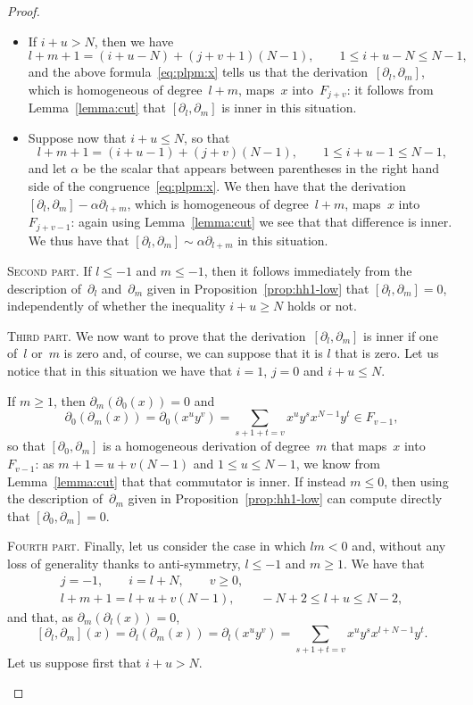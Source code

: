 \begin{proof}
\begin{itemize}
\item If $i+u>N$, then we have 
  \[
  l+m+1=(i+u-N)+(j+v+1)(N-1), 
  \qquad
  1\leq i+u-N\leq N-1,
  \]
and the above formula~\eqref{eq:plpm:x} tells us that the
derivation~$[\partial_l,\partial_m]$, which is homogeneous of degree~$l+m$,
maps~$x$ into~$F_{j+v}$: it follows from Lemma~\ref{lemma:cut} that
$[\partial_l,\partial_m]$ is inner in this situation.

\item Suppose now that $i+u\leq N$, so that
  \[
  l+m+1=(i+u-1)+(j+v)(N-1),
  \qquad
  1\leq i+u-1\leq N-1,
  \]
and let $\alpha$ be the scalar that appears between parentheses
in the right hand side of the congruence~\eqref{eq:plpm:x}. We then have that
the derivation $[\partial_l,\partial_m]-\alpha\partial_{l+m}$, which is
homogeneous of degree~$l+m$, maps~$x$ into~$F_{j+v-1}$: again using
Lemma~\ref{lemma:cut} we see that that difference is inner. 
We thus have that $[\partial_l,\partial_m]\sim\alpha\partial_{l+m}$ in this
situation.

\end{itemize}

\textsc{Second part.} If $l\leq-1$ and $m\leq-1$, then it follows immediately
from the description of~$\partial_l$ and~$\partial_m$ given in
Proposition~\ref{prop:hh1-low} that $[\partial_l,\partial_m]=0$,
independently of whether the inequality $i+u\geq N$ holds or not.

\medskip

\textsc{Third part.} We now want to prove that the
derivation~$[\partial_l,\partial_m]$ is inner if one of~$l$ or~$m$ is zero
and, of course, we can suppose that it is $l$ that is zero. Let us notice
that in this situation we have that 
$i=1$, $j=0$ and $i+u\leq N$.

If $m\geq1$, then $\partial_m(\partial_0(x))=0$ and
  \[
  \partial_0(\partial_m(x))
        = \partial_0(x^uy^v)
        = \sum_{s+1+t=v}x^uy^sx^{N-1}y^t
        \in F_{v-1},
  \]
so that $[\partial_0,\partial_m]$ is a homogeneous derivation of degree~$m$
that maps~$x$ into~$F_{v-1}$: as $m+1=u+v(N-1)$ and $1\leq u\leq N-1$, we know
from Lemma~\ref{lemma:cut} that that commutator is inner. If instead
$m\leq0$, then using the description of~$\partial_m$ given in
Proposition~\ref{prop:hh1-low} can compute directly that
$[\partial_0,\partial_m]=0$.

\medskip

\textsc{Fourth part.} Finally, let us consider the case in which $lm<0$
and, without any loss of generality thanks to anti-symmetry, $l\leq-1$ and
$m\geq1$. We have that 
  \begin{gather}
  j = -1, \qquad
  i = l+N,  \qquad
  v \geq 0, \\
  l+m+1=l+u+v(N-1), \qquad
  -N+2\leq l+u\leq N-2, \label{eq:r2}
  \end{gather}
and that, as $\partial_m(\partial_l(x))=0$, 
  \[
  [\partial_l,\partial_m](x)
        = \partial_l(\partial_m(x))
        = \partial_l(x^uy^v)
        = \sum_{s+1+t=v}x^uy^sx^{l+N-1}y^t. \label{eq:vx0}
  \]
Let us suppose first that $i+u>N$.
\begin{itemize}


\end{itemize}
\end{proof}
